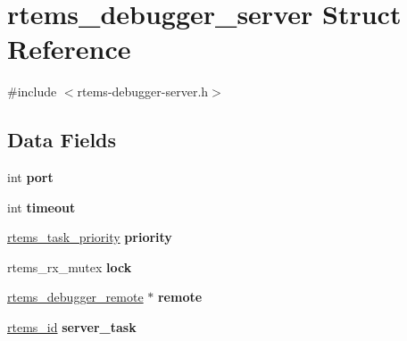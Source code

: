 \hypertarget{structrtems__debugger__server}{}\section{rtems\+\_\+debugger\+\_\+server Struct Reference}
\label{structrtems__debugger__server}


{\ttfamily \#include $<$rtems-\/debugger-\/server.\+h$>$}

\subsection*{Data Fields}
\begin{DoxyCompactItemize}
\item 
\mbox{\label{structrtems__debugger__server_af6d7eef97ffd3a94b2d1d78f092e784d}} 
int {\bfseries port}
\item 
\mbox{\label{structrtems__debugger__server_ab4304b61fa158e966e0219a3856705a9}} 
int {\bfseries timeout}
\item 
\mbox{\label{structrtems__debugger__server_a8ed541ee7eaf008f124b0ded3df9c85f}} 
\mbox{\hyperlink{group__ClassicTasks_gaa80a0c0938307d1e99d0eb5fee765b47}{rtems\+\_\+task\+\_\+priority}} {\bfseries priority}
\item 
\mbox{\label{structrtems__debugger__server_af5299d0736d58cbdccc89377755c623f}} 
rtems\+\_\+rx\+\_\+mutex {\bfseries lock}
\item 
\mbox{\label{structrtems__debugger__server_a91f58d808e1c53302b1e12764722600e}} 
\mbox{\hyperlink{structrtems__debugger__remote}{rtems\+\_\+debugger\+\_\+remote}} $\ast$ {\bfseries remote}
\item 
\mbox{\label{structrtems__debugger__server_a6bec1c767fb50b5e940234f427ff046e}} 
\mbox{\hyperlink{group__ClassicTasks_gab20892b814dced7dd4e5b9bf42becd57}{rtems\+\_\+id}} {\bfseries server\+\_\+task}
\item 
\mbox{\label{structrtems__debugger__server_ac1a7d2e5580a28c589235219eb48eafd}} 

\end{DoxyCompactItemize}
